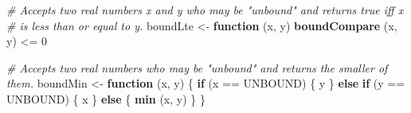 \documentclass[]{article}
\newenvironment{Shaded}{}{}
\newcommand{\CommentTok}[1]{\textcolor[rgb]{0.38,0.63,0.69}{\textit{#1}}}
\newcommand{\ControlFlowTok}[1]{\textcolor[rgb]{0.00,0.44,0.13}{\textbf{#1}}}
\newcommand{\DecValTok}[1]{\textcolor[rgb]{0.25,0.63,0.44}{#1}}
\newcommand{\KeywordTok}[1]{\textcolor[rgb]{0.00,0.44,0.13}{\textbf{#1}}}
\newcommand{\NormalTok}[1]{#1}
\newcommand{\OperatorTok}[1]{\textcolor[rgb]{0.40,0.40,0.40}{#1}}
\newcommand{\StringTok}[1]{\textcolor[rgb]{0.25,0.44,0.63}{#1}}
\begin{document}
\begin{Shaded}
\begin{Highlighting}[]
\CommentTok{# Accepts two real numbers x and y who may be "unbound" and returns true iff x}
\CommentTok{# is less than or equal to y.}
\NormalTok{boundLte <-}\StringTok{ }\ControlFlowTok{function}\NormalTok{ (x, y) }\KeywordTok{boundCompare}\NormalTok{ (x, y) }\OperatorTok{<=}\StringTok{ }\DecValTok{0}

\CommentTok{# Accepts two real numbers who may be "unbound" and returns the smaller of them.}
\NormalTok{boundMin <-}\StringTok{ }\ControlFlowTok{function}\NormalTok{ (x, y) \{}
  \ControlFlowTok{if}\NormalTok{ (x }\OperatorTok{==}\StringTok{ }\NormalTok{UNBOUND) \{}
\NormalTok{    y}
\NormalTok{  \} }\ControlFlowTok{else} \ControlFlowTok{if}\NormalTok{ (y }\OperatorTok{==}\StringTok{ }\NormalTok{UNBOUND) \{}
\NormalTok{    x}
\NormalTok{  \} }\ControlFlowTok{else}\NormalTok{ \{}
    \KeywordTok{min}\NormalTok{ (x, y)}
\NormalTok{  \}}
\NormalTok{\}}


\end{Highlighting}
\end{Shaded}
\end{document}
